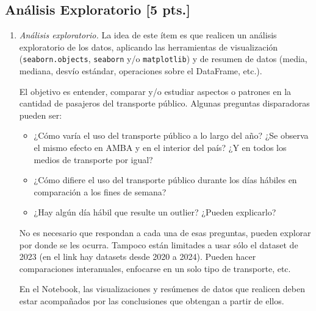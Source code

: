 \documentclass[a4paper,11pt]{article}
\theoremstyle{definition}
\begin{document}
\begin{enumerate}

\end{enumerate}

\subsection*{Análisis Exploratorio [5 pts.]}

\begin{enumerate}\addtocounter{enumi}{3}
\item \textit{Análisis exploratorio.} La idea de este ítem es que realicen un análisis exploratorio de los datos, aplicando las herramientas de visualización (\verb|seaborn.objects|, \verb|seaborn| y/o \verb|matplotlib|) y de resumen de datos (media, mediana, desvío estándar, operaciones sobre el DataFrame, etc.).

El objetivo es entender, comparar y/o estudiar aspectos o patrones en la cantidad de pasajeros del transporte público. Algunas preguntas disparadoras pueden ser:
\begin{itemize}
    \item ¿Cómo varía el uso del transporte público a lo largo del año? ¿Se observa el mismo efecto en AMBA y en el interior del país? ¿Y en todos los medios de transporte por igual?
    \item ¿Cómo difiere el uso del transporte público durante los días hábiles en comparación a los fines de semana?
    \item ¿Hay algún día hábil que resulte un outlier? ¿Pueden explicarlo?
\end{itemize}
No es necesario que respondan a cada una de esas preguntas, pueden explorar por donde se les ocurra. Tampoco están limitades a usar sólo el dataset de 2023 (en el link hay datasets desde 2020 a 2024). Pueden hacer comparaciones interanuales, enfocarse en un solo tipo de transporte, etc.

En el Notebook, las visualizaciones y resúmenes de datos que realicen deben estar acompañados por las conclusiones que obtengan a partir de ellos.

\end{enumerate}
\end{document}
